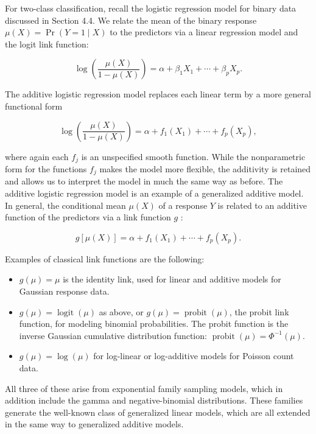 \documentclass[10pt]{article}
\begin{document}
For two-class classification, recall the logistic regression model for binary data discussed in Section 4.4. We relate the mean of the binary response $\mu(X)=\operatorname{Pr}(Y=1 \mid X)$ to the predictors via a linear regression model and the logit link function:


\begin{equation*}
\log \left(\frac{\mu(X)}{1-\mu(X)}\right)=\alpha+\beta_{1} X_{1}+\cdots+\beta_{p} X_{p} . \tag{9.2}
\end{equation*}


The additive logistic regression model replaces each linear term by a more general functional form


\begin{equation*}
\log \left(\frac{\mu(X)}{1-\mu(X)}\right)=\alpha+f_{1}\left(X_{1}\right)+\cdots+f_{p}\left(X_{p}\right), \tag{9.3}
\end{equation*}


where again each $f_{j}$ is an unspecified smooth function. While the nonparametric form for the functions $f_{j}$ makes the model more flexible, the additivity is retained and allows us to interpret the model in much the same way as before. The additive logistic regression model is an example of a generalized additive model. In general, the conditional mean $\mu(X)$ of a response $Y$ is related to an additive function of the predictors via a link function $g$ :


\begin{equation*}
g[\mu(X)]=\alpha+f_{1}\left(X_{1}\right)+\cdots+f_{p}\left(X_{p}\right) . \tag{9.4}
\end{equation*}


Examples of classical link functions are the following:

\begin{itemize}
  \item $g(\mu)=\mu$ is the identity link, used for linear and additive models for Gaussian response data.
  \item $g(\mu)=\operatorname{logit}(\mu)$ as above, or $g(\mu)=\operatorname{probit}(\mu)$, the probit link function, for modeling binomial probabilities. The probit function is the inverse Gaussian cumulative distribution function: $\operatorname{probit}(\mu)=\Phi^{-1}(\mu)$.
  \item $g(\mu)=\log (\mu)$ for log-linear or log-additive models for Poisson count data.
\end{itemize}

All three of these arise from exponential family sampling models, which in addition include the gamma and negative-binomial distributions. These families generate the well-known class of generalized linear models, which are all extended in the same way to generalized additive models.
\end{document}
